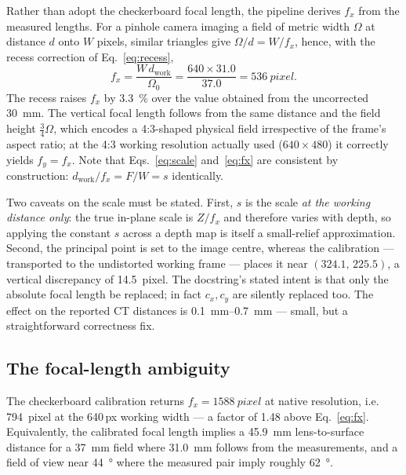 \documentclass[journal,10pt]{IEEEtran}
\begin{document}
Rather than adopt the checkerboard focal length, the pipeline derives $f_x$ from
the measured lengths. For a pinhole camera imaging a field of metric width
$\Omega$ at distance $d$ onto $W$ pixels, similar triangles give
$\Omega/d = W/f_x$, hence, with the recess correction of
Eq.~\eqref{eq:recess},
\begin{equation}
f_x = \frac{W\, d_\mathrm{work}}{\Omega_0} = \frac{640 \times 31.0}{37.0}
    = \SI{536}{pixel}.
\label{eq:fx}
\end{equation}
The recess raises $f_x$ by \SI{3.3}{\percent} over the value obtained from the
uncorrected \SI{30}{\milli\metre}.
The vertical focal length follows from the same distance and the field height
$\tfrac{3}{4}\Omega$, which encodes a \num{4}:\num{3}-shaped physical field
irrespective of the frame's aspect ratio; at the \num{4}:\num{3} working
resolution actually used ($640\times480$) it correctly yields $f_y = f_x$. Note
that Eqs.~\eqref{eq:scale} and~\eqref{eq:fx} are consistent by construction:
$d_\mathrm{work}/f_x = F/W = s$ identically.

Two caveats on the scale must be stated. First, $s$ is the scale \emph{at the
working distance only}: the true in-plane scale is $Z/f_x$ and therefore varies
with depth, so applying the constant $s$ across a depth map is itself a
small-relief approximation. Second, the principal point is set to the image
centre, whereas the calibration --- transported to the undistorted working frame
--- places it near $(324.1,\,225.5)$, a vertical discrepancy of
\SI{14.5}{pixel}. The docstring's stated intent is that only the absolute focal
length be replaced; in fact $c_x, c_y$ are silently replaced too. The effect on
the reported CT distances is \SIrange{0.1}{0.7}{\milli\metre} --- small, but a
straightforward correctness fix.

\subsection{The focal-length ambiguity}\label{sec:ambiguity}
The checkerboard calibration returns $f_x = \SI{1588}{pixel}$ at native
resolution, i.e. \SI{794}{pixel} at the \num{640}\,px working width --- a factor
of \num{1.48} above Eq.~\eqref{eq:fx}. Equivalently, the calibrated focal length
implies a \SI{45.9}{\milli\metre} lens-to-surface distance for a
\SI{37}{\milli\metre} field where \SI{31.0}{\milli\metre} follows from the
measurements, and a field of view near \SI{44}{\degree} where the measured pair
imply roughly \SI{62}{\degree}.
\end{document}
